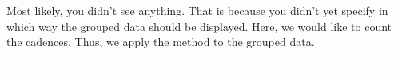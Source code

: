 \documentclass[letterpaper,10pt,english]{sphinxmanual}
\newlength\nbsphinxcodecellspacing
\begin{document}
Most likely, you didn’t see anything. That is because you didn’t yet specify in which way the grouped data should be displayed. Here, we would like to count the cadences. Thus, we apply the  method to the grouped data.

{
\begin{sphinxVerbatim}[commandchars=\\\{\}]
\llap{\color{nbsphinxin}[26]:\,\hspace{\fboxrule}\hspace{\fboxsep}}
\end{sphinxVerbatim}
}

{

\kern-\sphinxverbatimsmallskipamount\kern-\baselineskip
\kern+\FrameHeightAdjust\kern-\fboxrule
\vspace{\nbsphinxcodecellspacing}

}
\end{document}

